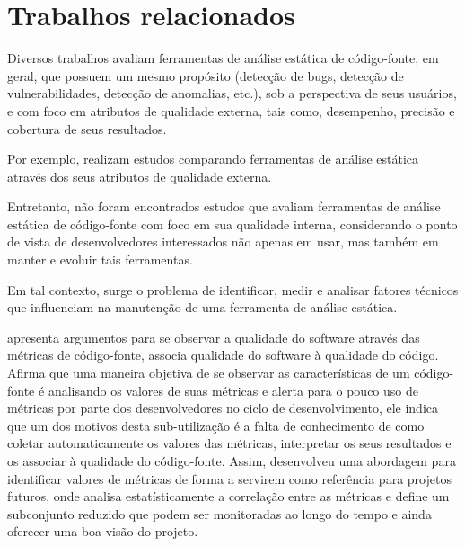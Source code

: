 \section{Trabalhos relacionados}

Diversos trabalhos avaliam ferramentas de análise estática de código-fonte,
em geral, que possuem um mesmo propósito (detecção de bugs, 
detecção de vulnerabilidades, detecção de anomalias, etc.),
sob a perspectiva de seus usuários, 
e com foco em atributos de qualidade externa, tais como, desempenho, 
precisão e cobertura de seus resultados. 

Por exemplo, \cite{Rutar2004} \cite{Kratkiewicz2005} \cite{Okun2007}
\cite{Emanuelsson2008} \cite{Wedyan2009} \cite{Mantere2009} \cite{Al2010}
\cite{Li2010} \cite{Johns2011} \cite{Alemerien2013} \cite{Ataide2014} realizam
estudos comparando ferramentas de análise estática através dos seus atributos
de qualidade externa.

Entretanto, não foram encontrados estudos que avaliam 
ferramentas de análise estática de código-fonte 
com foco em sua qualidade interna, 
considerando o ponto de vista de desenvolvedores interessados 
não apenas em usar, mas também em manter e evoluir tais ferramentas.

Em tal contexto, surge o problema de identificar, medir e analisar fatores
técnicos que influenciam na manutenção de uma ferramenta de análise estática. 

 apresenta argumentos para se observar a qualidade
do software através das métricas de código-fonte, associa qualidade do
software à qualidade do código. Afirma que uma maneira objetiva de se observar
as características de um código-fonte é analisando os valores de suas métricas
e alerta para o pouco uso de métricas por parte dos desenvolvedores no ciclo
de desenvolvimento, ele indica que um dos motivos desta sub-utilização
é a falta de conhecimento de como coletar automaticamente
os valores das métricas, interpretar os seus resultados e os associar à
qualidade do código-fonte. Assim, desenvolveu uma abordagem para identificar
valores de métricas de forma a servirem como referência para projetos futuros,
onde analisa estatísticamente a correlação entre as métricas e define um
subconjunto reduzido que podem ser monitoradas ao longo do tempo e
ainda oferecer uma boa visão do projeto.

